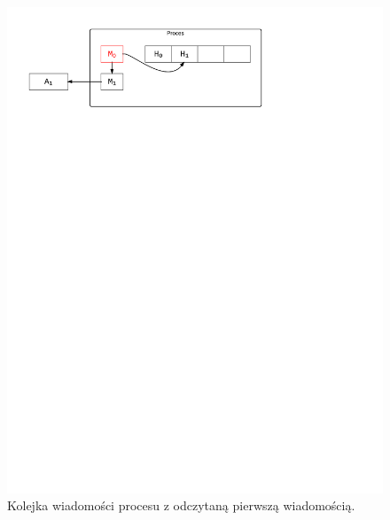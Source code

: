\begin{figure}[h]
\centerline{\includegraphics[scale=0.75, clip, trim=10mm 220mm 68mm 10mm]{mp3}}
\caption{Kolejka wiadomości procesu z odczytaną pierwszą wiadomością.}
\label{fig:mp3}
\end{figure}

